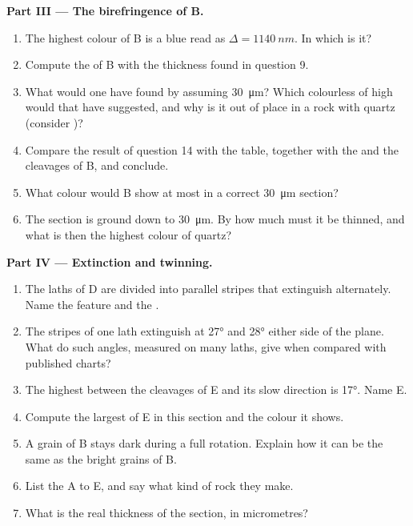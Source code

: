 \begin{problem}
\medskip
\noindent\textbf{Part III --- The birefringence of B.}
\begin{enumerate}[resume]
  \item The highest colour of B is a blue read as $\Delta = \qty{1140}{nm}$.
        In which  is it?
  \item Compute the  of B with the thickness found in
        question 9.
  \item What  would one have found by assuming
        \qty{30}{\micro m}? Which colourless  of high  would
        that have suggested, and why is it out of place in a rock with quartz
        (consider )?
  \item Compare the result of question 14 with the table, together with the
         and the cleavages of B, and conclude.
  \item What colour would B show at most in a correct \qty{30}{\micro m}
        section?
  \item The section is ground down to \qty{30}{\micro m}. By how much must it
        be thinned, and what is then the highest colour of quartz?
\end{enumerate}

\medskip
\noindent\textbf{Part IV --- Extinction and twinning.}
\begin{enumerate}[resume]
  \item The laths of D are divided into parallel stripes that extinguish
        alternately. Name the feature and the .
  \item The stripes of one lath extinguish at \ang{27} and \ang{28} either side
        of the  plane. What do such angles, measured on many laths, give
        when compared with published charts?
  \item The highest  between the cleavages of E and its slow
        direction is \ang{17}. Name E.
  \item Compute the largest  of E in this section and the colour
        it shows.
  \item A grain of B stays dark during a full rotation. Explain how it can be
        the same  as the bright grains of B.
  \item List the  A to E, and say what kind of rock they make.
  \item What is the real thickness of the section, in micrometres?
\end{enumerate}
\end{problem}

